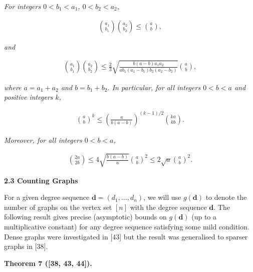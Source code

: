 \documentclass[10pt,a4paper]{article}
\begin{document}
\emph{For integers $0<b_{1}<a_{1}$, $0<b_{2}<a_{2}$,}\par


\[\begin{gathered}
\binom{a_{1}}{b_{1}}\binom{a_{2}}{b_{2}}\leq\binom{a}{b},
\end{gathered}\]


\emph{and}\par


\[\begin{gathered}
\binom{a_{1}}{b_{1}}\binom{a_{2}}{b_{2}}\leq\frac{2}{3}\sqrt{\frac{b(a-b)a_{1}a_{2}}{ab_{1}(a_{1}-b_{1})b_{2}(a_{2}-b_{2})}}\binom{a}{b},
\end{gathered}\]


\emph{where $a=a_{1}+a_{2}$ and $b=b_{1}+b_{2}$. In particular, for all integers $0<b<a$ and positive integers $k$,}\par


\[\begin{gathered}
\binom{a}{b}^{k}\leq\left(\frac{a}{b(a-b)}\right)^{(k-1)/2}\binom{ka}{kb}.
\end{gathered}\]


\emph{Moreover, for all integers $0<b<a$,}\par


\[\begin{gathered}
\binom{2a}{2b}\leq 4\sqrt{\frac{b(a-b)}{a}}\binom{a}{b}^{2}\leq 2\sqrt{a}\binom{a}{b}^{2}.
\end{gathered}\]







\par\medskip\noindent\textbf{
2.3 Counting Graphs}\par




For a given degree sequence $\mathbf{d}=(d_{1},\ldots,d_{n})$, we will use $g(\mathbf{d})$ to denote the number of graphs on the vertex set $[n]$ with the degree sequence $\mathbf{d}$. The following result gives precise (asymptotic) bounds on $g(\mathbf{d})$ (up to a multiplicative constant) for any degree sequence satisfying some mild condition. Dense graphs were investigated in [43] but the result was generalised to sparser graphs in [38].\par





\par\medskip\noindent\textbf{
\textbf{Theorem 7}\textbf{ }([38, 43, 44])\textbf{.}
}\par
\end{document}
